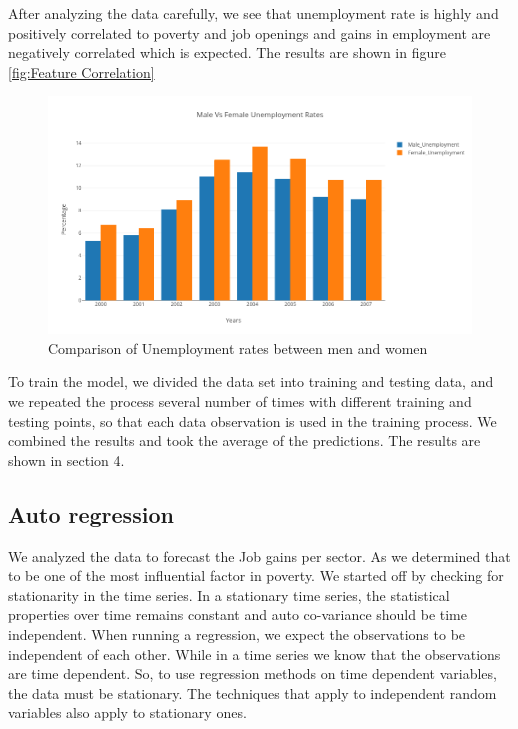 \documentclass[11pt,letterpaper]{article}
\begin{document}
After analyzing the data carefully, we see that unemployment rate is highly and positively correlated to poverty and job openings and gains in employment are negatively correlated which is expected. The results are shown in figure \ref{fig:Feature Correlation}

\begin{figure}
\centering
\includegraphics[width=\linewidth]{"./pictures/MaleVsFemaleUnemployment"}
\caption{Comparison of Unemployment rates between men and women}
\label{fig:MaleVsFemaleUnemployment}
\end{figure}

To train the model, we divided the data set into training and testing data, and we repeated the process several number of times with different training and testing points, so that each data observation is used in the training process. We combined the results and took the average of the predictions. The results are shown in section 4.

\subsection{Auto regression}
\label{ssec:autoreg}

We analyzed the data to forecast the Job gains per sector. As we determined that to be one of the most influential factor in poverty. We started off by checking for stationarity in the time series. In a stationary time series, the statistical properties over time remains constant and auto co-variance should be time independent. When running a  regression, we expect the observations to be independent of each other. While in a time series we know that the observations are time dependent. So, to use regression methods on time dependent variables, the data must be stationary. The techniques that apply to independent random variables also apply to stationary ones.
\end{document}
